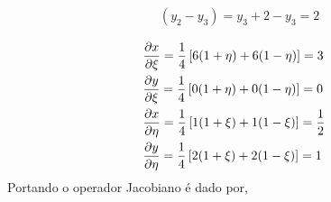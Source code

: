 \begin{itemize}
\begin{equation}
\begin{split}
		&	(y_2 - y_3) = y_3 + 2 - y_3 = 2\\
	\end{split}
	\end{equation}
	\begin{equation}
	\begin{split}
		&	\frac{\partial x}{\partial \xi } = \frac{1}{4}\left[ 6(1 + \eta) + 6(1 - \eta) \right] = 3\\
		&   \frac{\partial y}{\partial \xi } = \frac{1}{4}\left[ 0(1 + \eta) + 0(1 - \eta) \right] = 0\\
		&   \frac{\partial x}{\partial \eta} = \frac{1}{4}\left[ 1(1 + \xi ) + 1(1 - \xi ) \right] = \frac{1}{2}\\
		&   \frac{\partial y}{\partial \eta} = \frac{1}{4}\left[ 2(1 + \xi ) + 2(1 - \xi ) \right] = 1
	\end{split}
	\end{equation}
	Portando o operador Jacobiano é dado por,


\end{itemize}
